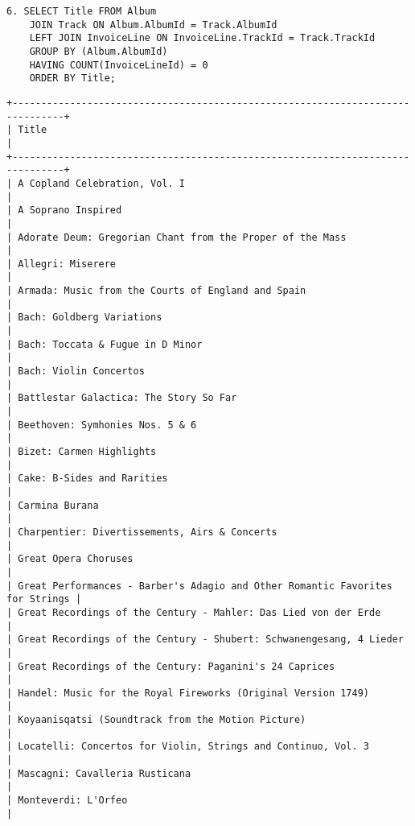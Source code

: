 \documentclass{article}
\begin{document}
\begin{lstlisting}
6. SELECT Title FROM Album
    JOIN Track ON Album.AlbumId = Track.AlbumId
    LEFT JOIN InvoiceLine ON InvoiceLine.TrackId = Track.TrackId
    GROUP BY (Album.AlbumId) 
    HAVING COUNT(InvoiceLineId) = 0
    ORDER BY Title;
\end{lstlisting}
\begin{lstlisting}[xleftmargin=-0.22in]
+-------------------------------------------------------------------------------+
| Title                                                                         |
+-------------------------------------------------------------------------------+
| A Copland Celebration, Vol. I                                                 |
| A Soprano Inspired                                                            |
| Adorate Deum: Gregorian Chant from the Proper of the Mass                     |
| Allegri: Miserere                                                             |
| Armada: Music from the Courts of England and Spain                            |
| Bach: Goldberg Variations                                                     |
| Bach: Toccata & Fugue in D Minor                                              |
| Bach: Violin Concertos                                                        |
| Battlestar Galactica: The Story So Far                                        |
| Beethoven: Symhonies Nos. 5 & 6                                               |
| Bizet: Carmen Highlights                                                      |
| Cake: B-Sides and Rarities                                                    |
| Carmina Burana                                                                |
| Charpentier: Divertissements, Airs & Concerts                                 |
| Great Opera Choruses                                                          |
| Great Performances - Barber's Adagio and Other Romantic Favorites for Strings |
| Great Recordings of the Century - Mahler: Das Lied von der Erde               |
| Great Recordings of the Century - Shubert: Schwanengesang, 4 Lieder           |
| Great Recordings of the Century: Paganini's 24 Caprices                       |
| Handel: Music for the Royal Fireworks (Original Version 1749)                 |
| Koyaanisqatsi (Soundtrack from the Motion Picture)                            |
| Locatelli: Concertos for Violin, Strings and Continuo, Vol. 3                 |
| Mascagni: Cavalleria Rusticana                                                |
| Monteverdi: L'Orfeo                                                           |

\end{lstlisting}
\end{document}
